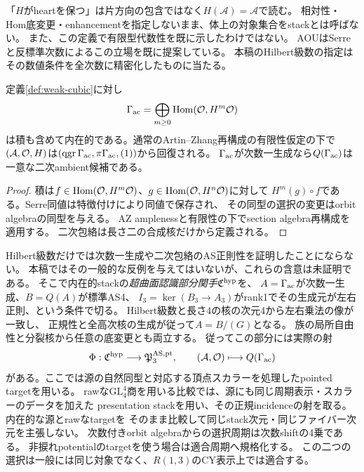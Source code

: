 「$H$がheartを保つ」は片方向の包含ではなく$H(\mathcal A)=\mathcal A$で読む。
相対性・Hom底変更・enhancementを指定しないまま、体上の対象集合をstackとは呼ばない。
また、この定義で有限型代数性を既に示したわけではない。
AOU\cite[Introduction, (2)]{AOU}はSerreと反標準次数によるこの立場を既に提案している。
本稿のHilbert級数の指定はその数値条件を全次数に精密化したものに当たる。

\begin{proposition}[反標準環とambient候補]\label{prop:intrinsic-ring}
定義\ref{def:weak-cubic}に対し
\[
 \Gamma_{\rm ac}=\bigoplus_{m\ge0}\operatorname{Hom}(\mathcal O,H^m\mathcal O)
\]
は積も含めて内在的である。通常のArtin--Zhang再構成の有限性仮定の下で
$(\mathcal A,\mathcal O,H)$は$(\operatorname{qgr}\Gamma_{\rm ac},\pi\Gamma_{\rm ac},(1))$から回復される。
$\Gamma_{\rm ac}$が次数一生成なら$Q(\Gamma_{\rm ac})$は一意な二次ambient候補である。
\end{proposition}
\begin{proof}
積は$f\in\operatorname{Hom}(\mathcal O,H^m\mathcal O)$、$g\in\operatorname{Hom}(\mathcal O,H^n\mathcal O)$に対して
$H^m(g)\circ f$である。Serre同値は特徴付けにより同値で保存され、
その同型の選択の変更はorbit algebraの同型を与える。
AZ amplenessと有限性の下でsection algebra再構成\cite{AZ}を適用する。
二次包絡は長さ二の合成核だけから定義される。
\end{proof}

Hilbert級数だけでは次数一生成や二次包絡のAS正則性を証明したことにならない。
本稿ではその一般的な反例を与えてはいないが、これらの含意は未証明である。
そこで内在的stackの\emph{超曲面認識部分関手}$\mathfrak C^{\rm hyp}$を、
$A=\Gamma_{\rm ac}$が次数一生成、$B=Q(A)$が標準AS4、
$I_3=\ker(B_3\to A_3)$がrank1でその生成元が左右正則、という条件で切る。
Hilbert級数と長さ4の核の次元4から左右乗法の像が一致し、
正規性と全高次核の生成が従って$A=B/(G)$となる。
族の局所自由性と分裂核から任意の底変更とも両立する。
従ってこの部分には実際の射
\begin{equation}\label{eq:ambient-map}
 \Phi:\mathfrak C^{\rm hyp}\longrightarrow\mathfrak P^{\rm AS,pt}_3,
 \qquad(\mathcal A,\mathcal O)\longmapsto Q(\Gamma_{\rm ac})
\end{equation}
がある。ここでは源の自然同型と対応する頂点スカラーを処理したpointed targetを用いる。
rawな$\mathrm{GL}_4^4$商を用いる比較では、源にも同じ周期表示・スカラーのデータを加えた
presentation stackを用い、その正規incidenceの射を取る。内在的な源とrawなtargetを
そのまま比較して同じstack次元・同じファイバー次元を主張しない。
次数付きorbit algebraからの選択周期は次数shiftの4乗である。
非捩れpotentialのtargetを使う場合は適合周期へ規格化する。
この二つの選択は一般には同じ対象でなく、$R(1,3)$のCY表示上では適合する。

